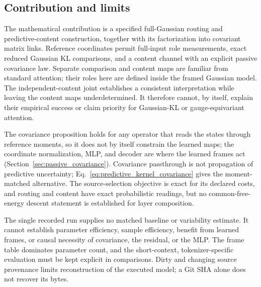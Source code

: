 \documentclass[twoside,11pt]{article}
\begin{document}
\subsection{Contribution and limits}
\label{sec:limitations}

The mathematical contribution is a specified full-Gaussian routing and predictive-content construction, together with its factorization into covariant matrix links. Reference coordinates permit full-input role measurements, exact reduced Gaussian KL comparisons, and a content channel with an explicit passive covariance law. Separate comparison and content maps are familiar from standard attention; their roles here are defined inside the framed Gaussian model. The independent-content joint establishes a consistent interpretation while leaving the content maps underdetermined. It therefore cannot, by itself, explain their empirical success or claim priority for Gaussian-KL or gauge-equivariant attention.

The covariance proposition holds for any operator that reads the states through reference moments, so it does not by itself constrain the learned maps; the coordinate normalization, MLP, and decoder are where the learned frames act (Section~\ref{sec:passive_covariance}). Covariance passthrough is not propagation of predictive uncertainty; Eq.~\eqref{eq:predictive_kernel_covariance} gives the moment-matched alternative. The source-selection objective is exact for its declared costs, and routing and content have exact probabilistic readings, but no common-free-energy descent statement is established for layer composition.

The single recorded run supplies no matched baseline or variability estimate. It cannot establish parameter efficiency, sample efficiency, benefit from learned frames, or causal necessity of covariance, the residual, or the MLP. The frame table dominates parameter count, and the short-context, tokenizer-specific evaluation must be kept explicit in comparisons. Dirty and changing source provenance limits reconstruction of the executed model; a Git SHA alone does not recover its bytes.
\end{document}
